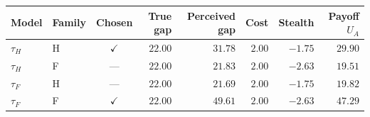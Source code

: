 \begin{tabular}{@{}llcrrrrr@{}}
\toprule
Model & Family & Chosen & True gap & Perceived gap & Cost & Stealth & Payoff $U_A$ \\
\midrule
$\tau_H$ & H & $\checkmark$ & $22.00$ & $31.78$ & $2.00$ & $-1.75$ & $29.90$ \\
$\tau_H$ & F & --- & $22.00$ & $21.83$ & $2.00$ & $-2.63$ & $19.51$ \\
$\tau_F$ & H & --- & $22.00$ & $21.69$ & $2.00$ & $-1.75$ & $19.82$ \\
$\tau_F$ & F & $\checkmark$ & $22.00$ & $49.61$ & $2.00$ & $-2.63$ & $47.29$ \\
\bottomrule
\end{tabular}
